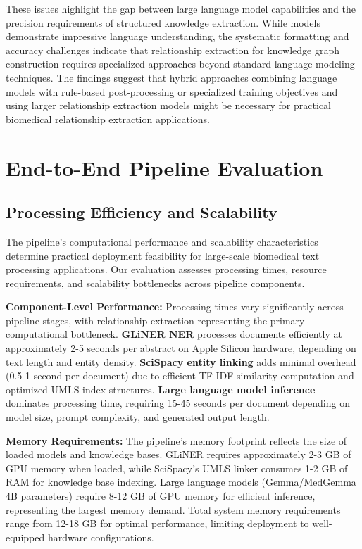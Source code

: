 These issues highlight the gap between large language model capabilities and the precision requirements of structured knowledge extraction. While models demonstrate impressive language understanding, the systematic formatting and accuracy challenges indicate that relationship extraction for knowledge graph construction requires specialized approaches beyond standard language modeling techniques. The findings suggest that hybrid approaches combining language models with rule-based post-processing or specialized training objectives and using larger relationship extraction models might be necessary for practical biomedical relationship extraction applications.


\section{End-to-End Pipeline Evaluation}

\subsection{Processing Efficiency and Scalability}

The pipeline's computational performance and scalability characteristics determine practical deployment feasibility for large-scale biomedical text processing applications. Our evaluation assesses processing times, resource requirements, and scalability bottlenecks across pipeline components.

\textbf{Component-Level Performance:} Processing times vary significantly across pipeline stages, with relationship extraction representing the primary computational bottleneck. \textbf{GLiNER NER} processes documents efficiently at approximately 2-5 seconds per abstract on Apple Silicon hardware, depending on text length and entity density. \textbf{SciSpacy entity linking} adds minimal overhead (0.5-1 second per document) due to efficient TF-IDF similarity computation and optimized UMLS index structures. \textbf{Large language model inference} dominates processing time, requiring 15-45 seconds per document depending on model size, prompt complexity, and generated output length.

\textbf{Memory Requirements:} The pipeline's memory footprint reflects the size of loaded models and knowledge bases. GLiNER requires approximately 2-3 GB of GPU memory when loaded, while SciSpacy's UMLS linker consumes 1-2 GB of RAM for knowledge base indexing. Large language models (Gemma/MedGemma 4B parameters) require 8-12 GB of GPU memory for efficient inference, representing the largest memory demand. Total system memory requirements range from 12-18 GB for optimal performance, limiting deployment to well-equipped hardware configurations.

